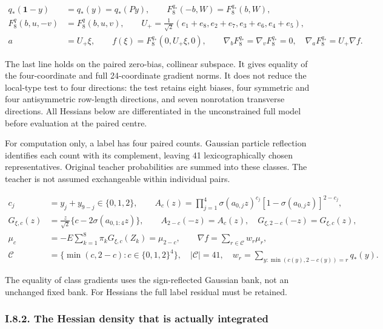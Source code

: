 \documentclass{article}
\begin{document}
\[
\begin{aligned}
q_*(\mathbf1-y)&=q_*(y)=q_*(Py),\qquad
F_8^{q_*}(-b,W)=F_8^{q_*}(b,W),\\
F_8^q(b,u,-v)&=F_8^q(b,u,v),\qquad
U_+=\frac1{\sqrt2}(e_1+e_8,e_2+e_7,e_3+e_6,e_4+e_5),\\
a&=U_+\xi,\qquad f(\xi)=F_8^{q_*}(0,U_+\xi,0),\qquad
\nabla_bF_8^{q_*}=\nabla_vF_8^{q_*}=0,\quad \nabla_aF_8^{q_*}=U_+\nabla f.
\end{aligned}
\tag{I.22}
\]

The last line holds on the paired zero-bias, collinear subspace. It
gives equality of the four-coordinate and full 24-coordinate gradient
norms. It does not reduce the local-type test to four directions: the
test retains eight biases, four symmetric and four antisymmetric
row-length directions, and seven nonrotation transverse directions. All
Hessians below are differentiated in the unconstrained full model before
evaluation at the paired centre.

For computation only, a label has four paired counts. Gaussian particle
reflection identifies each count with its complement, leaving 41
lexicographically chosen representatives. Original teacher probabilities
are summed into these classes. The teacher is not assumed exchangeable
within individual pairs.

\[
\begin{aligned}
c_j&=y_j+y_{9-j}\in\{0,1,2\},\qquad
A_c(z)=\prod_{j=1}^4\sigma(a_{0,j}z)^{c_j}[1-\sigma(a_{0,j}z)]^{2-c_j},\\
G_{\xi,c}(z)&=\frac z{\sqrt2}\{c-2\sigma(a_{0,1:4}z)\},\qquad
A_{2-c}(-z)=A_c(z),\quad G_{\xi,2-c}(-z)=G_{\xi,c}(z),\\
\mu_c&=-E\sum_{k=1}^8\pi_kG_{\xi,c}(Z_k)=\mu_{2-c},\qquad
\nabla f=\sum_{r\in\mathcal C}w_r\mu_r,\\
\mathcal C&=\{\min(c,2-c):c\in\{0,1,2\}^4\},\quad|\mathcal C|=41,\quad
w_r=\sum_{y:\min(c(y),2-c(y))=r}q_*(y).
\end{aligned}
\tag{I.23}
\]

The equality of class gradients uses the sign-reflected Gaussian bank,
not an unchanged fixed bank. For Hessians the full label residual must
be retained.

\subsubsection*{I.8.2. The Hessian density that is actually
integrated}\label{i.8.2.-the-hessian-density-that-is-actually-integrated}
\end{document}
